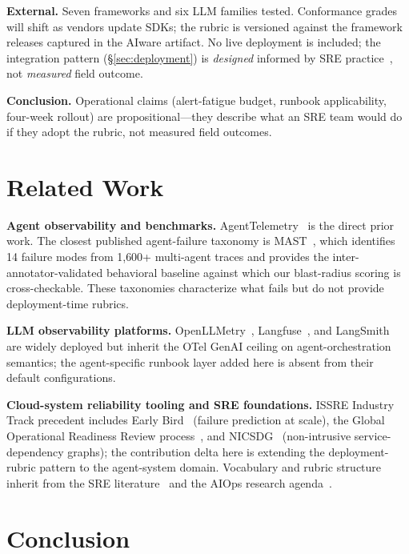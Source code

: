 \documentclass[conference]{IEEEtran}
\begin{document}
\textbf{External.} Seven frameworks and six LLM families tested.
Conformance grades will shift as vendors update SDKs; the rubric is
versioned against the framework releases captured in the AIware
artifact. No live deployment is included; the integration pattern
(\S\ref{sec:deployment}) is \emph{designed} informed by SRE
practice~\cite{sre_book}, not \emph{measured} field outcome.

\textbf{Conclusion.} Operational claims (alert-fatigue budget,
runbook applicability, four-week rollout) are propositional---they
describe what an SRE team would do if they adopt the rubric, not
measured field outcomes.

\section{Related Work}
\label{sec:related}

\textbf{Agent observability and benchmarks.}
AgentTelemetry~\cite{agenttelemetry_aiware} is the direct prior
work. The closest published agent-failure taxonomy is
MAST~\cite{mast}, which identifies 14 failure modes from 1{,}600+
multi-agent traces and provides the inter-annotator-validated
behavioral baseline against which our blast-radius scoring is
cross-checkable. These taxonomies characterize what fails but do
not provide deployment-time rubrics.

\textbf{LLM observability platforms.}
OpenLLMetry~\cite{openllmetry}, Langfuse~\cite{langfuse}, and
LangSmith~\cite{langsmith} are widely deployed but inherit the
OTel GenAI ceiling on agent-orchestration semantics; the
agent-specific runbook layer added here is absent from their
default configurations.

\textbf{Cloud-system reliability tooling and SRE foundations.}
ISSRE Industry Track precedent includes
Early Bird~\cite{earlybird} (failure prediction at scale), the
Global Operational Readiness Review process~\cite{cusick_orr}, and
NICSDG~\cite{nicsdg} (non-intrusive service-dependency graphs);
the contribution delta here is extending the deployment-rubric
pattern to the agent-system domain. Vocabulary and rubric
structure inherit from the SRE literature~\cite{sre_book,sre_workbook}
and the AIOps research agenda~\cite{aiops_roadmap}.

\section{Conclusion}
\label{sec:conclusion}
\end{document}
